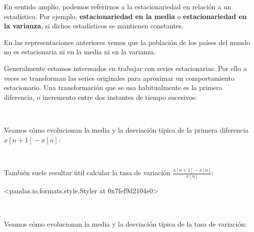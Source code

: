 \documentclass[11pt]{article}
\begin{document}
En sentido amplio, podemos referirnos a la estacionariedad en relación a
un estadístico. Por ejemplo, \textbf{estacionariedad en la media} o
\textbf{estacionariedad en la varianza}, si dichos estadísticos se
mantienen constantes.

En las representaciones anteriores vemos que la población de los países
del mundo no es estacionaria ni en la media ni en la varianza.

    Generalmente estamos interesados en trabajar con series estacionarias.
Por ello a veces se transforman las series originales para aproximar un
comportamiento estacionario. Una transformación que se usa habitualmente
es la primera diferencia, o incremento entre dos instantes de tiempo
sucesivos:

    \begin{center}
    \end{center}
    { \hspace*{\fill} \\}
    
    Veamos cómo evolucionan la media y la desviación típica de la primera
diferencia \(x[n+1]-x[n]\):

    \begin{center}
    \end{center}
    { \hspace*{\fill} \\}
    
    También suele resultar útil calcular la tasa de variación
\(\frac{x[n+1]-x[n]}{x[n]}\):

<pandas.io.formats.style.Styler at 0x7fef9d2104e0>
            
    \begin{center}
    \end{center}
    { \hspace*{\fill} \\}
    
    Veamos cómo evolucionan la media y la desviación típica de la tasa de
variación:

    \begin{center}
    \end{center}
    { \hspace*{\fill} \\}
    
\end{document}

